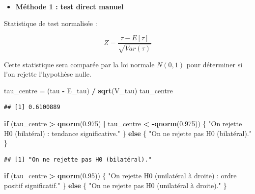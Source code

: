 \documentclass[
  12pt,
]{article}
\newenvironment{Shaded}{\begin{snugshade}}{\end{snugshade}}
\newcommand{\ControlFlowTok}[1]{\textcolor[rgb]{0.13,0.29,0.53}{\textbf{#1}}}
\newcommand{\FloatTok}[1]{\textcolor[rgb]{0.00,0.00,0.81}{#1}}
\newcommand{\FunctionTok}[1]{\textcolor[rgb]{0.13,0.29,0.53}{\textbf{#1}}}
\newcommand{\NormalTok}[1]{#1}
\newcommand{\OtherTok}[1]{\textcolor[rgb]{0.56,0.35,0.01}{#1}}
\newcommand{\SpecialCharTok}[1]{\textcolor[rgb]{0.81,0.36,0.00}{\textbf{#1}}}
\newcommand{\StringTok}[1]{\textcolor[rgb]{0.31,0.60,0.02}{#1}}
\providecommand{\tightlist}{%
  \setlength{\itemsep}{0pt}\setlength{\parskip}{0pt}}
\begin{document}
\begin{itemize}
\tightlist
\item
  \textbf{Méthode 1 : test direct manuel}
\end{itemize}

Statistique de test normalisée :

\[ Z = \dfrac{τ−E[τ]}{ \sqrt{Var(\tau)} }\]

Cette statistique sera comparée par la loi normale \(N(0,1)\) pour
déterminer si l'on rejette l'hypothèse nulle.

\begin{Shaded}
\begin{Highlighting}[]
\NormalTok{tau\_centre }\OtherTok{=}\NormalTok{ (tau }\SpecialCharTok{{-}}\NormalTok{ E\_tau) }\SpecialCharTok{/} \FunctionTok{sqrt}\NormalTok{(V\_tau)}
\NormalTok{tau\_centre}
\end{Highlighting}
\end{Shaded}

\begin{verbatim}
## [1] 0.6100889
\end{verbatim}

\begin{Shaded}
\begin{Highlighting}[]
\ControlFlowTok{if}\NormalTok{ (tau\_centre }\SpecialCharTok{\textgreater{}} \FunctionTok{qnorm}\NormalTok{(}\FloatTok{0.975}\NormalTok{) }\SpecialCharTok{|}\NormalTok{ tau\_centre }\SpecialCharTok{\textless{}} \SpecialCharTok{{-}}\FunctionTok{qnorm}\NormalTok{(}\FloatTok{0.975}\NormalTok{)) \{}
  \StringTok{"On rejette H0 (bilatéral) : tendance significative."}
\NormalTok{\} }\ControlFlowTok{else}\NormalTok{ \{}
  \StringTok{"On ne rejette pas H0 (bilatéral)."}
\NormalTok{\}}
\end{Highlighting}
\end{Shaded}

\begin{verbatim}
## [1] "On ne rejette pas H0 (bilatéral)."
\end{verbatim}

\begin{Shaded}
\begin{Highlighting}[]
\ControlFlowTok{if}\NormalTok{ (tau\_centre }\SpecialCharTok{\textgreater{}} \FunctionTok{qnorm}\NormalTok{(}\FloatTok{0.95}\NormalTok{)) \{}
  \StringTok{"On rejette H0 (unilatéral à droite) : ordre positif significatif."}
\NormalTok{\} }\ControlFlowTok{else}\NormalTok{ \{}
  \StringTok{"On ne rejette pas H0 (unilatéral à droite)."}
\NormalTok{\}}
\end{Highlighting}
\end{Shaded}
\end{document}
